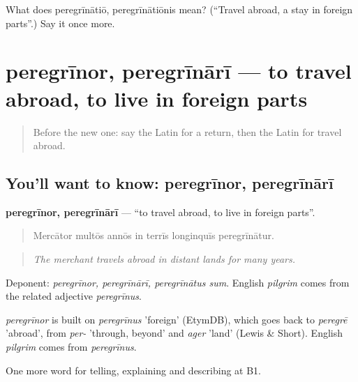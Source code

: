 \begin{tcolorbox}[breakable,colback=teal!4,colframe=teal!35!black,title={Before you move on}]
What does peregrīnātiō, peregrīnātiōnis mean? (\textquotedblleft{}Travel abroad, a stay in foreign parts\textquotedblright{}.) Say it once more.
\end{tcolorbox}
\section[peregrīnor, peregrīnārī]{peregrīnor, peregrīnārī — to travel abroad, to live in foreign parts}

\label{lesson:LA-C428-peregrinor}



\begin{quote}
Before the new one: say the Latin for a return, then the Latin for travel abroad.
\end{quote}

\subsection*{You'll want to know: peregrīnor, peregrīnārī}
\textbf{peregrīnor, peregrīnārī} — \textquotedblleft{}to travel abroad, to live in foreign parts\textquotedblright{}.

\begin{quote}
Mercātor multōs annōs in terrīs longinquīs peregrīnātur.
\end{quote}

\begin{quote}
\emph{The merchant travels abroad in distant lands for many years.}
\end{quote}

Deponent: \emph{peregrīnor, peregrīnārī, peregrīnātus sum}. English \emph{pilgrim} comes from the related adjective \emph{peregrīnus}.

\begin{cousinweb}
\emph{peregrīnor} is built on \emph{peregrīnus} 'foreign' (EtymDB), which goes back to \emph{peregrē} 'abroad', from \emph{per-} 'through, beyond' and \emph{ager} 'land' (Lewis \& Short). English \emph{pilgrim} comes from \emph{peregrīnus}.
\end{cousinweb}

\begin{grammarlens}[title={What you've built}]
One more word for telling, explaining and describing at B1.
\end{grammarlens}

